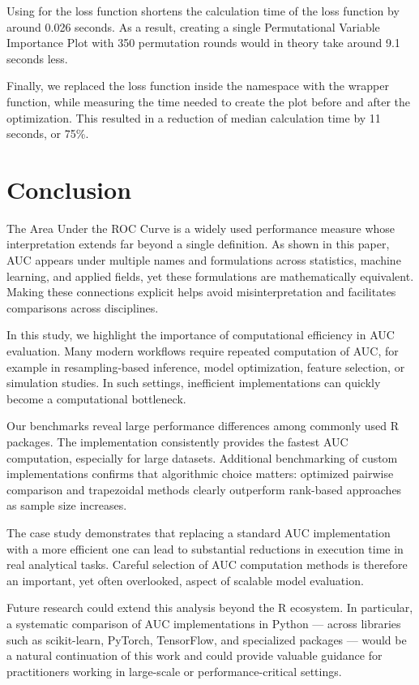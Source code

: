 Using  for the loss function shortens the calculation
time of the loss function by around 0.026 seconds. As a result, creating
a single Permutational Variable Importance Plot with 350 permutation
rounds would in theory take around 9.1 seconds less.

Finally, we replaced the loss function inside the 
namespace with the  wrapper function, while measuring
the time needed to create the plot before and after the optimization.
This resulted in a reduction of median calculation time by 11 seconds,
or 75\%.

\section{Conclusion}\label{conclusion}

The Area Under the ROC Curve is a widely used performance measure whose
interpretation extends far beyond a single definition. As shown in this
paper, AUC appears under multiple names and formulations across
statistics, machine learning, and applied fields, yet these formulations
are mathematically equivalent. Making these connections explicit helps
avoid misinterpretation and facilitates comparisons across disciplines.

In this study, we highlight the importance of computational efficiency
in AUC evaluation. Many modern workflows require repeated computation of
AUC, for example in resampling-based inference, model optimization,
feature selection, or simulation studies. In such settings, inefficient
implementations can quickly become a computational bottleneck.

Our benchmarks reveal large performance differences among commonly used
R packages. The  implementation consistently provides
the fastest AUC computation, especially for large datasets. Additional
benchmarking of custom implementations confirms that algorithmic choice
matters: optimized pairwise comparison and trapezoidal methods clearly
outperform rank-based approaches as sample size increases.

The case study demonstrates that replacing a standard AUC implementation
with a more efficient one can lead to substantial reductions in
execution time in real analytical tasks. Careful selection of AUC
computation methods is therefore an important, yet often overlooked,
aspect of scalable model evaluation.

Future research could extend this analysis beyond the R ecosystem. In
particular, a systematic comparison of AUC implementations in Python ---
across libraries such as scikit-learn, PyTorch, TensorFlow, and
specialized packages --- would be a natural continuation of this work and
could provide valuable guidance for practitioners working in large-scale
or performance-critical settings.


